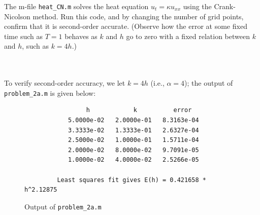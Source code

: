 The m-file \texttt{heat\_CN.m} solves the heat equation $u_t = \kappa u_{xx}$ using the Crank-Nicolson method. Run this
code, and by changing the number of grid points, confirm that it is second-order accurate. (Observe how the error at
some fixed time such as $T = 1$ behaves as $k$ and $h$ go to zero with a fixed relation between $k$ and $h$, such as
$k = 4h$.)

\begin{solution}\ \\\\
    To verify second-order accuracy, we let $k = 4h$ (i.e., $\alpha = 4$); the output of \texttt{problem\_2a.m} is 
    given below:

    \begin{figure}[h]
        \centering
        \begin{verbatim}
                 h            k          error
            5.0000e-02   2.0000e-01   8.3163e-04
            3.3333e-02   1.3333e-01   2.6327e-04
            2.5000e-02   1.0000e-01   1.5711e-04
            2.0000e-02   8.0000e-02   9.7091e-05
            1.0000e-02   4.0000e-02   2.5266e-05
          
         Least squares fit gives E(h) = 0.421658 * h^2.12875
        \end{verbatim}
        \caption{Output of \texttt{problem\_2a.m}}
    \end{figure}
    

\end{solution}
